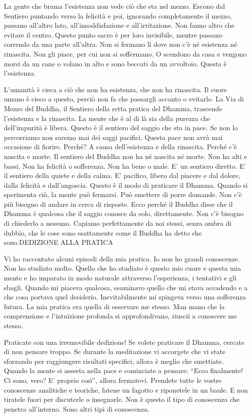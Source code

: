 La gente che brama l'esistenza non vede ciò che sta nel mezzo. Escono
dal Sentiero puntando verso la felicità e poi, ignorando completamente
il mezzo, passano all'altro lato, all'insoddisfazione e all'irritazione.
Non fanno altro che evitare il centro. Questo punto sacro è per loro
invisibile, mentre passano correndo da una parte all'altra. Non si
fermano lì dove non c'è né esistenza né rinascita. Non gli piace, per
cui non si soffermano. O scendono da casa e vengono morsi da un cane o
volano in alto e sono beccati da un avvoltoio. Questa è l'esistenza.

L'umanità è cieca a ciò che non ha esistenza, che non ha rinascita. Il
cuore umano è cieco a questo, perciò non fa che passargli accanto o
evitarlo. La Via di Mezzo del Buddha, il Sentiero della retta pratica
del Dhamma, trascende l'esistenza e la rinascita. La mente che è al di
là sia della purezza che dell'impurità è libera. Questo è il sentiero
del saggio che sta in pace. Se non lo percorriamo non saremo mai dei
saggi pacifici. Questa pace non avrà mai occasione di fiorire. Perché? A
causa dell'esistenza e della rinascita. Perché c'è nascita e morte. Il
sentiero del Buddha non ha né nascita né morte. Non ha alti e bassi. Non
ha felicità o sofferenza. Non ha bene o male. E' un sentiero diretto. E'
il sentiero della quiete e della calma. E' pacifico, libero dal piacere
e dal dolore, dalla felicità e dall'angoscia. Questo è il modo di
praticare il Dhamma. Quando si sperimenta ciò, la mente può fermarsi.
Può smettere di porre domande. Non c'è più bisogno di andare in cerca di
risposte. Ecco perché il Buddha disse che il Dhamma è qualcosa che il
saggio conosce da solo, direttamente. Non c'è bisogno di chiederlo a
nessuno. Capiamo perfettamente da noi stessi, senza ombra di dubbio, che
le cose sono esattamente come il Buddha ha detto che sono.DEDIZIONE ALLA
PRATICA

Vi ho raccontato alcuni episodi della mia pratica. Io non ho grandi
conoscenze. Non ho studiato molto. Quello che ho studiato è questo mio
cuore e questa mia mente e ho imparato in modo naturale attraverso
l'esperienza, i tentativi e gli sbagli. Quando mi piaceva qualcosa,
esaminavo quello che mi stava accadendo e a che cosa portava quel
desiderio. Inevitabilmente mi spingeva verso una sofferenza futura. La
mia pratica era quella di osservare me stesso. Man mano che la
comprensione e l'intuizione profonda si approfondivano, riuscii a
conoscere me stesso.

Praticate con una irremovibile dedizione! Se volete praticare il Dhamma,
cercate di non pensare troppo. Se durante la meditazione vi accorgete
che vi state sforzando per raggiungere risultati specifici, allora è
meglio che smettiate. Quando la mente si assesta nella pace e cominciate
a pensare: ``Ecco finalmente! Ci sono, vero? E' proprio così'', allora
fermatevi. Prendete tutte le vostre conoscenze analitiche e teoriche,
fatene un fagotto e riponetele in un baule. E non tiratele fuori per
discuterle o insegnarle. Non è questo il tipo di conoscenza che penetra
all'interno. Sono altri tipi di conoscenza.


